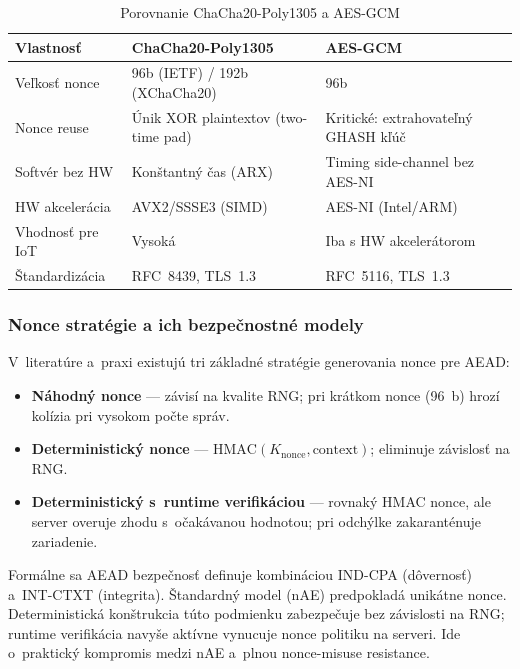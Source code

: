 \begin{table}[H]
\renewcommand{\arraystretch}{1.3}
\centering
\caption{Porovnanie ChaCha20-Poly1305 a AES-GCM}
\label{tab:chacha-vs-aesgcm}
\small
\begin{tabular}{p{3.2cm} p{4.5cm} p{4.5cm}}
\toprule
\textbf{Vlastnosť} & \textbf{ChaCha20-Poly1305} & \textbf{AES-GCM} \\
\midrule
Veľkosť nonce & 96b (IETF) / 192b (XChaCha20) & 96b \\
Nonce reuse & Únik XOR plaintextov (two-time pad) & Kritické: extrahovateľný GHASH kľúč\cite{RFC5116} \\
Softvér bez HW & Konštantný čas (ARX)\cite{Bernstein2012} & Timing side-channel bez AES-NI \\
HW akcelerácia & AVX2/SSSE3 (SIMD) & AES-NI (Intel/ARM) \\
Vhodnosť pre IoT & Vysoká & Iba s HW akcelerátorom \\
Štandardizácia & RFC~8439, TLS~1.3 & RFC~5116, TLS~1.3 \\
\bottomrule
\end{tabular}
\end{table}

\subsubsection{Nonce stratégie a ich bezpečnostné modely}

V~literatúre a~praxi existujú tri základné stratégie generovania nonce pre AEAD:
\begin{itemize}[leftmargin=*,itemsep=2pt]
  \item \textbf{Náhodný nonce} --- závisí na kvalite RNG; pri krátkom nonce (96~b) hrozí kolízia pri vysokom počte správ.
  \item \textbf{Deterministický nonce} --- $\text{HMAC}(K_{\text{nonce}}, \text{context})$; eliminuje závislosť na RNG.
  \item \textbf{Deterministický s~runtime verifikáciou} --- rovnaký HMAC nonce, ale server overuje zhodu s~očakávanou hodnotou; pri odchýlke zakaranténuje zariadenie.
\end{itemize}

Formálne sa AEAD bezpečnosť definuje kombináciou IND-CPA (dôvernosť) a~INT-CTXT (integrita)\cite{RFC5116}. Štandardný model (nAE) predpokladá unikátne nonce. Deterministická konštrukcia túto podmienku zabezpečuje bez závislosti na RNG; runtime verifikácia navyše aktívne vynucuje nonce politiku na serveri. Ide o~praktický kompromis medzi nAE a~plnou nonce-misuse resistance\cite{RogawayNonceMisuse2004,BellareNonceMisuse2006}.

